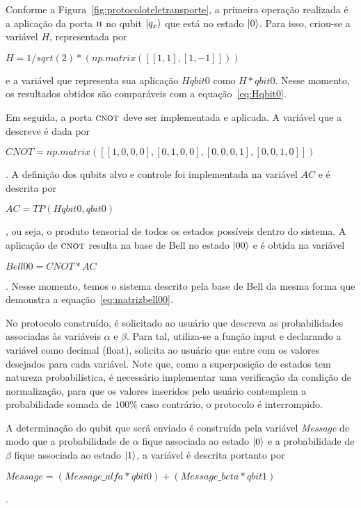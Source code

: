 Conforme a Figura~\ref{fig:protocoloteletransporte}, a primeira operação realizada é a aplicação da porta \(\operatorname{\textsc{h}}\) no qubit $\ket{q_x}$ que está no estado $\ket{0}$. Para isso, criou-se a variável $H$, representada por \begin{tiny}\textbf{$H = 1/sqrt(2)*(np.matrix([[1,1], [1,-1]]))$}\end{tiny} e a variável que representa sua aplicação $Hqbit0$ como $H*qbit0$. Nesse momento, os resultados obtidos são comparáveis com a equação~\eqref{eq:Hqbit0}. 

Em seguida, a porta \(\operatorname{\textsc{cnot}}\) deve ser implementada e aplicada. A variável que a descreve é dada por \begin{tiny}\textbf{$CNOT = np.matrix([[1,0,0,0],[0,1,0,0],[0,0,0,1],[0,0,1,0]])$}\end{tiny}. A definição dos qubits alvo e controle foi implementada na variável $AC$ e é descrita por \begin{tiny}\textbf{$AC= TP(Hqbit0,qbit0)$}\end{tiny}, ou seja, o produto tensorial de todos os estados possíveis dentro do sistema. A aplicação de \(\operatorname{\textsc{cnot}}\) resulta na base de Bell no estado $\ket{00}$ e é obtida na variável \begin{tiny}\textbf{$Bell00 = CNOT * AC$}\end{tiny}. Nesse momento, temos o sistema descrito pela base de Bell da mesma forma que demonstra a equação~\eqref{eq:matrizbell00}. 

No protocolo construído, é solicitado ao usuário que descreva as probabilidades associadas às variáveis $\alpha$ e $\beta$. Para tal, utiliza-se a função input e declarando a variável como decimal (float), solicita ao usuário que entre com os valores desejados para cada variável. Note que, como a superposição de estados tem natureza probabilística, é necessário implementar uma verificação da condição de normalização, para que os valores inseridos pelo usuário contemplem a probabilidade somada de $100\%$ caso contrário, o protocolo é interrompido.

A determinação do qubit que será enviado é construída pela variável \textit{Message} de modo que a probabilidade de $\alpha$ fique associada ao estado $\ket{0}$ e a probabilidade de $\beta$ fique associada ao estado $\ket{1}$, a variável é descrita portanto por \begin{tiny}\textbf{$Message = (Message\_alfa * qbit0) + (Message\_beta * qbit1)$}\end{tiny}.

